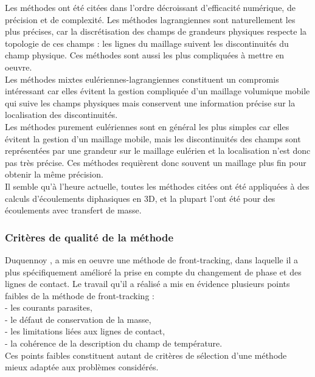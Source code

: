 Les m\'ethodes ont \'et\'e cit\'ees dans l'ordre d\'ecroissant d'efficacit\'e num\'erique, de pr\'ecision et de complexit\'e. Les m\'ethodes lagrangiennes sont naturellement les plus pr\'ecises, car la discr\'etisation des champs de grandeurs physiques respecte la topologie de ces champs : les lignes du maillage suivent les discontinuit\'es du champ physique. Ces m\'ethodes sont aussi les plus compliqu\'ees à mettre en oeuvre.\\
Les m\'ethodes mixtes eul\'eriennes-lagrangiennes constituent un compromis int\'eressant car elles \'evitent la gestion compliqu\'ee d'un maillage volumique mobile qui suive les champs physiques mais conservent une information pr\'ecise sur la localisation des discontinuit\'es.\\
Les m\'ethodes purement eul\'eriennes sont en g\'en\'eral les plus simples car elles \'evitent la gestion d'un maillage mobile, mais les discontinuit\'es des champs sont repr\'esent\'ees par une grandeur sur le maillage eul\'erien et la localisation n'est donc pas très pr\'ecise. Ces m\'ethodes requi\`erent donc souvent un maillage plus fin pour obtenir la même pr\'ecision.\\
Il semble qu'\`a l'heure actuelle, toutes les m\'ethodes cit\'ees ont \'et\'e appliqu\'ees \`a des calculs d'\'ecoulements diphasiques en 3D, et la plupart l'ont \'et\'e pour des \'ecoulements avec transfert de masse.

\subsubsection{Critères de qualit\'e de la m\'ethode}
Duquennoy \cite{Duquennoy2000}, \cite{Duquennoy2000_2} a mis en oeuvre une m\'ethode de front-tracking, dans laquelle il a plus sp\'ecifiquement am\'elior\'e la prise en compte du changement de phase et des lignes de contact. Le travail qu'il a r\'ealis\'e a mis en \'evidence plusieurs points faibles de la m\'ethode de front-tracking :\\
- les courants parasites,\\
- le d\'efaut de conservation de la masse,\\
- les limitations li\'ees aux lignes de contact,\\
- la coh\'erence de la description du champ de temp\'erature.\\
Ces points faibles constituent autant de crit\`eres de s\'election d'une m\'ethode
mieux adapt\'ee aux problèmes consid\'er\'es.\smallskip \\

